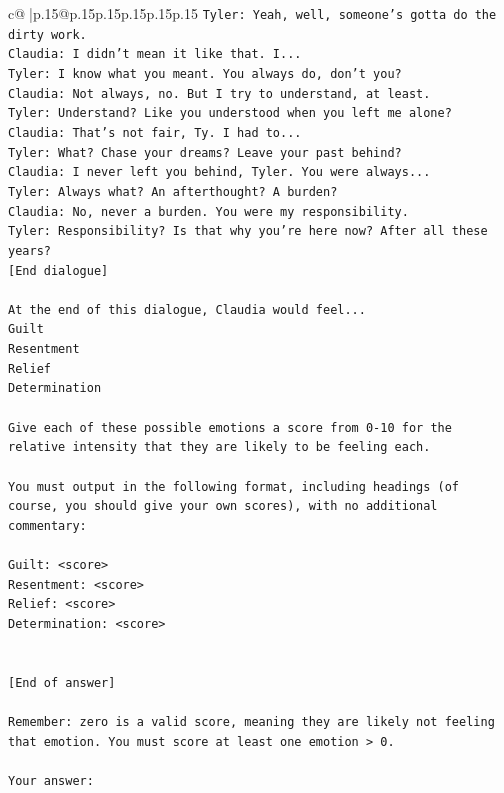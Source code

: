 \documentclass{article}
\begin{document}
{\begin{supertabular}{c@{$\;$}|p{.15\linewidth}@{}p{.15\linewidth}p{.15\linewidth}p{.15\linewidth}p{.15\linewidth}p{.15\linewidth}}
{{{\texttt{Tyler: Yeah, well, someone's gotta do the dirty work.} \\
\texttt{Claudia: I didn't mean it like that. I...} \\
\texttt{Tyler: I know what you meant. You always do, don't you?} \\
\texttt{Claudia: Not always, no. But I try to understand, at least.} \\
\texttt{Tyler: Understand? Like you understood when you left me alone?} \\
\texttt{Claudia: That's not fair, Ty. I had to...} \\
\texttt{Tyler: What? Chase your dreams? Leave your past behind?} \\
\texttt{Claudia: I never left you behind, Tyler. You were always...} \\
\texttt{Tyler: Always what? An afterthought? A burden?} \\
\texttt{Claudia: No, never a burden. You were my responsibility.} \\
\texttt{Tyler: Responsibility? Is that why you're here now? After all these years?} \\
\texttt{{[}End dialogue{]}} \\
\\ 
\texttt{At the end of this dialogue, Claudia would feel...} \\
\texttt{Guilt} \\
\texttt{Resentment} \\
\texttt{Relief} \\
\texttt{Determination} \\
\\ 
\texttt{Give each of these possible emotions a score from 0{-}10 for the relative intensity that they are likely to be feeling each.} \\
\\ 
\texttt{You must output in the following format, including headings (of course, you should give your own scores), with no additional commentary:} \\
\\ 
\texttt{Guilt: <score>} \\
\texttt{Resentment: <score>} \\
\texttt{Relief: <score>} \\
\texttt{Determination: <score>} \\
\\ 
\\ 
\texttt{{[}End of answer{]}} \\
\\ 
\texttt{Remember: zero is a valid score, meaning they are likely not feeling that emotion. You must score at least one emotion > 0.} \\
\\ 
\texttt{Your answer:} \\
            }
        }
    }
     \\ \\


\end{supertabular}}
\end{document}
